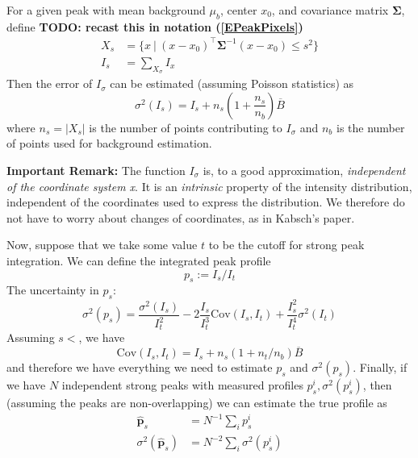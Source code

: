 \documentclass[11pt,a4paper]{article}
\let\oldhat\hat
\renewcommand{\hat}[1]{\oldhat{\mathbf{#1}}}
\def\v#1{\bm{{#1}}}
\def\tr{^\intercal}
\def\cov{\mathrm{Cov}}
\begin{document}
For a given peak with mean background $\mu_b$, center $x_0$, and covariance matrix $\v\Sigma$,
define
\textbf{TODO: recast this in notation (\ref{EPeakPixels})}
\begin{align}
  X_s &= \{ x \ | \ (x-x_0)\tr\v\Sigma^{-1}(x-x_0) \leq s^2\} \\
  I_s &= \sum_{X_\sigma} I_x
\end{align}
Then the error of $I_\sigma$ can be estimated (assuming Poisson statistics) as
\begin{equation}
  \sigma^2(I_s) = I_s + n_s(1+\frac{n_s}{n_b}) \overline{B}
\end{equation}
where $n_s = |X_s|$ is the number of points contributing to $I_\sigma$ and $n_b$ is the number of points used for background estimation.

\textbf{Important Remark:} The function $I_\sigma$ is, to a good approximation, \emph{independent of the coordinate system x}.
It is an \emph{intrinsic} property of the intensity distribution, independent of the coordinates used to express the distribution.
We therefore do not have to worry about changes of coordinates, as in Kabsch's paper.


Now, suppose that we take some value $t$ to be the cutoff for strong peak integration. We can define the integrated peak profile
\begin{equation}
  p_s := I_s / I_t
\end{equation}
The uncertainty in $p_s$:
\begin{equation}
  \sigma^2(p_s)
  = \frac{\sigma^2(I_s)}{I_t^2} - 2 \frac{I_s}{I_t^3} \cov(I_s, I_t)
    + \frac{I_s^2}{I_t^4} \sigma^2(I_t)
\end{equation}
Assuming $s < $, we have
\begin{equation}
  \cov(I_s, I_t) = I_s + n_s(1+n_t/n_b)\overline{B}
\end{equation}
and therefore we have everything we need to estimate $p_s$ and $\sigma^2(p_s)$. Finally, if we have $N$ independent strong
peaks with measured profiles $p^i_s, \sigma^2(p^i_s)$, then (assuming the peaks are non-overlapping) we can estimate the
true profile as
\begin{align}
  \hat{p}_s &= N^{-1} \sum_i p^i_s \\
 \sigma^2(\hat{p}_s) &= N^{-2} \sum_i \sigma^2(p^i_s)
\end{align}
\end{document}
